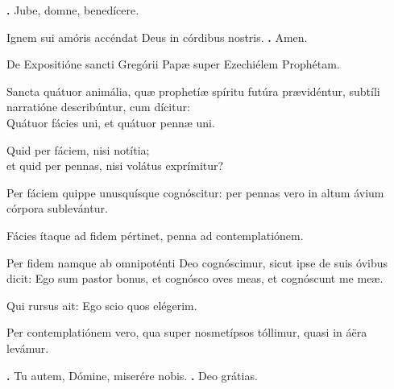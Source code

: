\begin{small}
\textbf{\Vbar.} Jube, domne, benedícere.

Ignem sui amóris accéndat Deus in córdibus nostris.
\textbf{\Rbar.} Amen.
\end{small}


De Expositióne sancti Gregórii Papæ super Ezechiélem Prophétam.

Sancta quátuor animália, quæ prophetíæ spíritu futúra prævidéntur, subtíli narratióne describúntur, cum dícitur: \\

Quátuor fácies uni, et quátuor pennæ uni. 

Quid per fáciem, nisi notítia; \\
et quid per pennas, nisi volátus exprímitur? 

Per fáciem quippe unusquísque cognóscitur: per pennas vero in altum ávium córpora sublevántur. 

Fácies ítaque ad fidem pértinet, penna ad contemplatiónem. 

Per fidem namque ab omnipoténti Deo cognóscimur, sicut ipse de suis óvibus dicit: Ego sum pastor bonus, et cognósco oves meas, et cognóscunt me meæ. 

Qui rursus ait: Ego scio quos elégerim. 

Per contemplatiónem vero, qua super nosmetípsos tóllimur, quasi in áëra levámur.

\textbf{\Vbar.} Tu autem, Dómine, miserére nobis.
\textbf{\Rbar.} Deo grátias.

